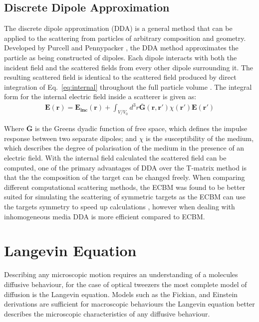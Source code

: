 \subsection{Discrete Dipole Approximation}
The discrete dipole approximation (DDA) is a general method that can 
be applied to the scattering from particles of arbitrary composition
and geometry. Developed by Purcell and Pennypacker \cite{Purcell1973}, 
the DDA method approximates the particle as being constructed of dipoles.
Each dipole interacts with both the incident field and the scattered fields
from every other dipole surrounding it. The resulting scattered field is 
identical to the scattered field produced by direct integration of 
Eq.~\eqref{eq:internal} throughout the full particle volume \cite{Goedecke1988}.
The integral form for the internal electric field inside a scatterer is 
given as:
\begin{align}
	\mathbf{E(r)} = \mathbf{E_{inc}(r)} + \int_{V/V_0}d^3r\mathbf{\bar{G}(r,r')}
	\chi(\mathbf{r'})\mathbf{E(r')}
\end{align}

Where $\mathbf{\bar{G}}$ is the Greens dyadic function of free space, which
defines the impulse response between two separate dipoles; and $\chi$ is the 
susceptibility of the medium, which describes the degree of polarisation of
the medium in the presence of an electric field. With the internal field 
calculated the scattered field can be computed, one of the primary advantages
of DDA over the T-matrix method is that the the composition of the target can 
be changed freely. When comparing different computational scattering methods,
the ECBM was found to be better suited for simulating the scattering of symmetric
targets as the ECBM can use the targets symmetry to speed up calculations \cite{Wriedt1998},
however when dealing with inhomogeneous media DDA is more efficient compared to
ECBM. 

\section{Langevin Equation}
Describing any microscopic motion requires an understanding of a molecules
diffusive behaviour, for the case of optical tweezers the most complete model 
of diffusion is the Langevin equation. Models such as the Fickian, and Einstein 
derivations are sufficient for macroscopic behaviours the Langevin equation 
better describes the microscopic characteristics of any diffusive behaviour.
 

